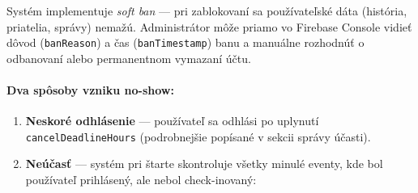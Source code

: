   Systém implementuje \textit{soft ban} --- pri zablokovaní sa používateľské dáta
  (história, priatelia, správy) nemažú. Administrátor môže priamo vo Firebase
  Console vidieť dôvod (\texttt{banReason}) a čas (\texttt{banTimestamp}) banu
  a manuálne rozhodnúť o odbanovaní alebo permanentnom vymazaní účtu.

  \paragraph{Dva spôsoby vzniku no-show:}
  \begin{enumerate}

      \item \textbf{Neskoré odhlásenie} — používateľ sa odhlási po uplynutí
            \texttt{cancelDeadlineHours} (podrobnejšie popísané v sekcii
            správy účasti).

      \item \textbf{Neúčasť} — systém pri štarte skontroluje všetky minulé
            eventy, kde bol používateľ prihlásený, ale nebol check-inovaný:
  
  \end{enumerate}


